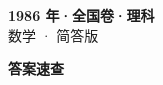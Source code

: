 \documentclass[zihao=-4, a4paper]{ctexart}
\begin{document}
\begin{center}
  {\Large\bfseries 1986 年·全国卷·理科}\\[4pt]
  {\large 数学 · 简答版}
\end{center}
\medskip
{}

\clearpage
{}
\begin{center}{\Large\bfseries 答案速查}\end{center}
\medskip

\end{document}
